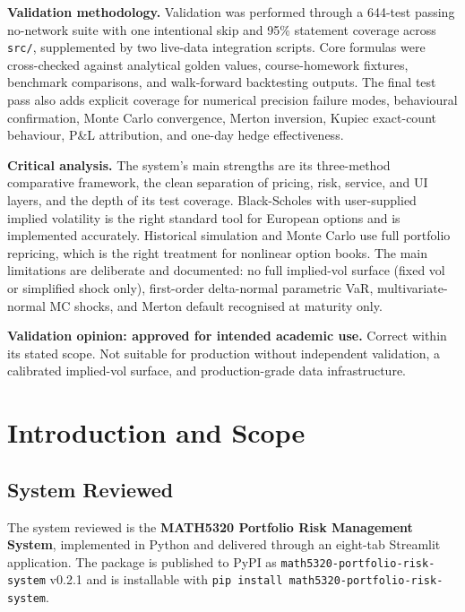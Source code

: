 \documentclass[11pt]{article}
\newcommand{\code}[1]{\texttt{#1}}
\begin{document}
\textbf{Validation methodology.}  Validation was performed through a
644-test passing no-network suite with one intentional skip and 95\%
statement coverage across \code{src/}, supplemented by two live-data
integration scripts.  Core formulas were cross-checked against analytical
golden values, course-homework fixtures, benchmark comparisons, and
walk-forward backtesting outputs.  The final test pass also adds explicit
coverage for numerical precision failure modes, behavioural confirmation,
Monte Carlo convergence, Merton inversion, Kupiec exact-count behaviour,
P\&L attribution, and one-day hedge effectiveness.

\textbf{Critical analysis.}  The system's main strengths are its
three-method comparative framework, the clean separation of pricing,
risk, service, and UI layers, and the depth of its test coverage.
Black-Scholes with user-supplied implied volatility is the right standard
tool for European options and is implemented accurately.  Historical
simulation and Monte Carlo use full portfolio repricing, which is the
right treatment for nonlinear option books.  The main limitations are deliberate and documented: no full implied-vol
surface (fixed vol or simplified shock only), first-order delta-normal
parametric VaR, multivariate-normal MC shocks, and Merton default
recognised at maturity only.

\textbf{Validation opinion: approved for intended academic use.}
Correct within its stated scope.  Not suitable for production without
independent validation, a calibrated implied-vol surface, and
production-grade data infrastructure.

\section{Introduction and Scope}
\label{sec:scope}

\subsection{System Reviewed}

The system reviewed is the \textbf{MATH5320 Portfolio Risk Management
System}, implemented in Python and delivered through an eight-tab
Streamlit application.  The package is published to PyPI as
\code{math5320-\allowbreak portfolio-risk-system} v0.2.1 and is
installable with \code{pip install math5320-\allowbreak portfolio-risk-system}.
\end{document}
